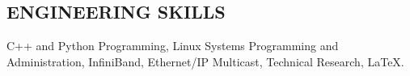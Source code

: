 \documentclass{res}
\begin{document}
\begin{resume}
\section{ENGINEERING SKILLS}
 C++ and Python Programming, Linux Systems Programming and Administration, InfiniBand, Ethernet/IP Multicast, Technical Research, \LaTeX{}.
 
\end{resume}
\end{document}
